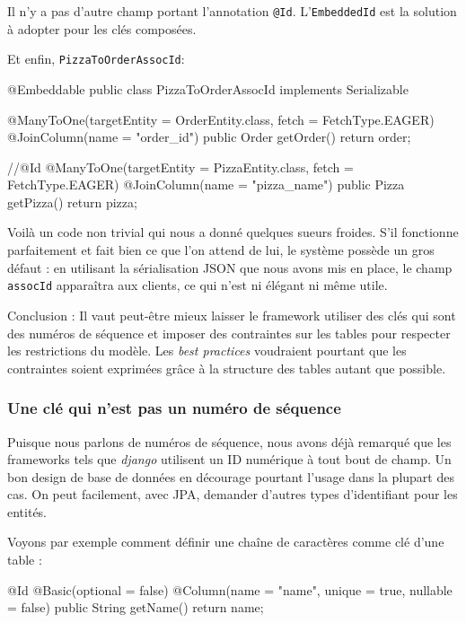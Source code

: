 Il n'y a pas d'autre champ portant l'annotation \verb|@Id|. L'\verb|EmbeddedId| est la solution
à adopter pour les clés composées.

Et enfin, \verb|PizzaToOrderAssocId|:

\begin{javacode}
@Embeddable
public class PizzaToOrderAssocId implements Serializable {
    @ManyToOne(targetEntity = OrderEntity.class, fetch = FetchType.EAGER)
    @JoinColumn(name = "order_id")
    public Order getOrder() {
        return order;
    }

    //@Id
    @ManyToOne(targetEntity = PizzaEntity.class, fetch = FetchType.EAGER)
    @JoinColumn(name = "pizza_name")
    public Pizza getPizza() {
        return pizza;
    }
}
\end{javacode}

Voilà un code non trivial qui nous a donné quelques sueurs froides.
S'il fonctionne parfaitement et fait bien ce que l'on attend de lui, 
le système possède un gros défaut : en utilisant la sérialisation JSON que nous avons mis en place, 
le champ \verb|assocId| apparaîtra aux clients, ce qui n'est ni élégant ni même utile.

Conclusion : Il vaut peut-être mieux laisser le framework utiliser des clés qui sont des numéros de séquence
et imposer des contraintes sur les tables pour respecter les restrictions du modèle. Les \emph{best practices}
voudraient pourtant que les contraintes soient exprimées grâce à la structure des tables autant que possible.


\subsubsection{Une clé qui n'est pas un numéro de séquence}

Puisque nous parlons de numéros de séquence, nous avons déjà remarqué que les frameworks tels que \emph{django}
utilisent un ID numérique à tout bout de champ. Un bon design de base de données en décourage pourtant l'usage
dans la plupart des cas. On peut facilement, avec JPA, demander d'autres types d'identifiant pour les entités.

Voyons par exemple comment définir une chaîne de caractères comme clé d'une table :

\begin{javacode}
    @Id
    @Basic(optional = false)
    @Column(name = "name", unique = true, nullable = false)
    public String getName() {
        return name;
    }
\end{javacode}

